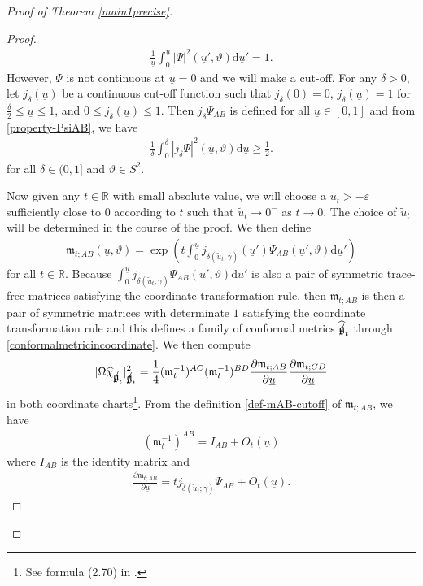 \documentclass[11pt,reqno]{amsart}
\theoremstyle{definition}
\numberwithin{equation}{section}
\newcommand{\D}{\mathrm{d}}
\def\chih{\widehat{\chi}}
\def\ub{\underline{u}}
\newcommand{\tdelta}{\widetilde{\delta}}
\newcommand{\tu}{\widetilde{u}}
\def\gfs{\mbox{$\mathfrak{g} \mkern -9mu /$}}
\begin{document}
\begin{proof}[Proof of Theorem \ref{main1precise}]
\begin{proof}
\begin{align}\label{property-PsiAB}
\frac{1}{\ub}\int_0^{\ub}|\Psi|^2(\ub',\vartheta)\D\ub'=1.
\end{align}
However, $\Psi$ is not continuous at $\ub=0$ and we will make a cut-off. For any $\delta>0$, let $j_\delta(\ub)$ be a continuous cut-off function such that $j_\delta(0)=0$, $j_\delta(\ub)=1$ for $\frac{\delta}{2}\le \ub\le1$, and $0\le j_\delta(\ub)\le 1$. Then $j_\delta\Psi_{AB}$ is defined for all $\ub\in[0,1]$ and from \eqref{property-PsiAB}, we have
\begin{align}\label{property-jdeltaPsiAB}
\frac{1}{\delta}\int_0^{\delta}|j_\delta\Psi|^2(\ub,\vartheta)\D\ub\ge\frac{1}{2}.
\end{align}
for all $\delta\in(0,1]$ and $\vartheta\in S^2$.

Now given any $t\in\mathbb{R}$ with small absolute value, we will choose a $\tu_t>-\varepsilon$ sufficiently close to $0$ according to $t$ such that $\tu_t\to0^-$ as $t\to0$. The choice of $\tu_t$ will be determined in the course of the proof. We then define
\begin{align}\label{def-mAB-cutoff}
\mathfrak{m}_{t;AB}(\ub,\vartheta)=\exp\left(t\int_0^{\ub}j_{\tdelta(\tu_t;\gamma)}(\ub')\Psi_{AB}(\ub',\vartheta)\D\ub'\right)
\end{align}
for all $t\in\mathbb{R}$. Because $\int_0^{\ub}j_{\tdelta(\tu_t;\gamma)}\Psi_{AB}(\ub',\vartheta)\D\ub'$ is also a pair of symmetric trace-free matrices satisfying the coordinate transformation rule, then $\mathfrak{m}_{t;AB}$  is then a pair of symmetric matrices with determinate $1$ satisfying the coordinate transformation rule and this defines a family of conformal metrics $\widehat{\gfs}_t$ through \eqref{conformalmetricincoordinate}. We then compute
\begin{align*}
|\Omega\chih_{\gfs_t}|^2_{\gfs_t}=\frac{1}{4}(\mathfrak{m}^{-1}_t)^{AC}(\mathfrak{m}^{-1}_t)^{BD}\frac{\partial \mathfrak{m}_{t;AB}}{\partial\ub}\frac{\partial \mathfrak{m}_{t;CD}}{\partial\ub}
\end{align*}
in both coordinate charts\footnote{See formula (2.70) in \cite{Chr}.}. From the definition \eqref{def-mAB-cutoff} of $\mathfrak{m}_{t;AB}$, we have
\begin{align*}
(\mathfrak{m}_t^{-1})^{AB}=I_{AB}+O_t(\ub)
\end{align*}
where $I_{AB}$ is the identity matrix and
\begin{align*}
\frac{\partial \mathfrak{m}_{t;AB}}{\partial\ub}=tj_{\tdelta(\tu_t;\gamma)}\Psi_{AB}+O_t(\ub).

\end{align*}
\end{proof}
\end{proof}
\end{document}
